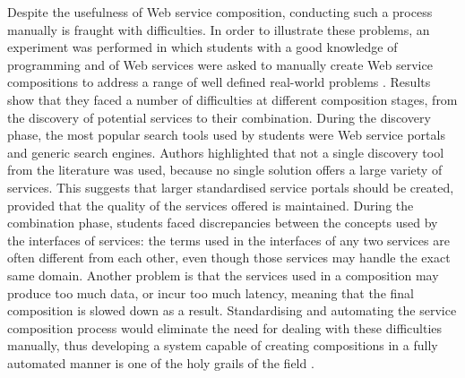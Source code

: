 Despite the usefulness of Web service composition, conducting such a process manually is fraught with difficulties. 
In order to illustrate these problems, an experiment was performed in which students with a good knowledge of programming and of Web services were asked to manually create Web service compositions to address a range of well defined real-world problems \cite{lu2007web}. Results show that they faced a number of difficulties at different composition stages, from the discovery of potential services to their combination. During the discovery phase, the most popular search tools used by students were Web service portals and generic search engines. Authors highlighted that not a single discovery tool from the literature was used, because no single solution offers a large variety of services. This suggests that larger standardised service portals should be created, provided that the quality of the services offered is maintained. During the combination phase, students faced discrepancies between the concepts used by the interfaces of services: the terms used in the interfaces of any two services are often different from each other, even though those services may handle the exact same domain. Another problem is that the services used in a composition may produce too much data, or incur too much latency, meaning that the final composition is slowed down as a result. Standardising and automating the service composition process would eliminate the need for dealing with these difficulties manually, thus developing a system capable of creating compositions in a fully automated manner is one of the holy grails of the field \cite{milanovic2004current}.


